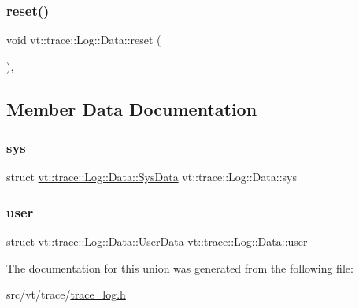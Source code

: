 \subsubsection{\texorpdfstring{reset()}{reset()}}
{\footnotesize\ttfamily void vt\+::trace\+::\+Log\+::\+Data\+::reset (\begin{DoxyParamCaption}{ }\end{DoxyParamCaption})\hspace{0.3cm}{\ttfamily [inline]}, {\ttfamily [private]}}



\subsection{Member Data Documentation}
\mbox{\label{unionvt_1_1trace_1_1_log_1_1_data_a71322b10139cee6014cd6be83c99b3d9}} 
\subsubsection{\texorpdfstring{sys}{sys}}
{\footnotesize\ttfamily struct \hyperlink{structvt_1_1trace_1_1_log_1_1_data_1_1_sys_data}{vt\+::trace\+::\+Log\+::\+Data\+::\+Sys\+Data}  vt\+::trace\+::\+Log\+::\+Data\+::sys}

\mbox{\label{unionvt_1_1trace_1_1_log_1_1_data_a8d893c0de3ee2fca0852607fa908a2e6}} 
\subsubsection{\texorpdfstring{user}{user}}
{\footnotesize\ttfamily struct \hyperlink{structvt_1_1trace_1_1_log_1_1_data_1_1_user_data}{vt\+::trace\+::\+Log\+::\+Data\+::\+User\+Data}  vt\+::trace\+::\+Log\+::\+Data\+::user}



The documentation for this union was generated from the following file\+:\begin{DoxyCompactItemize}
\item 
src/vt/trace/\hyperlink{trace__log_8h}{trace\+\_\+log.\+h}\end{DoxyCompactItemize}
